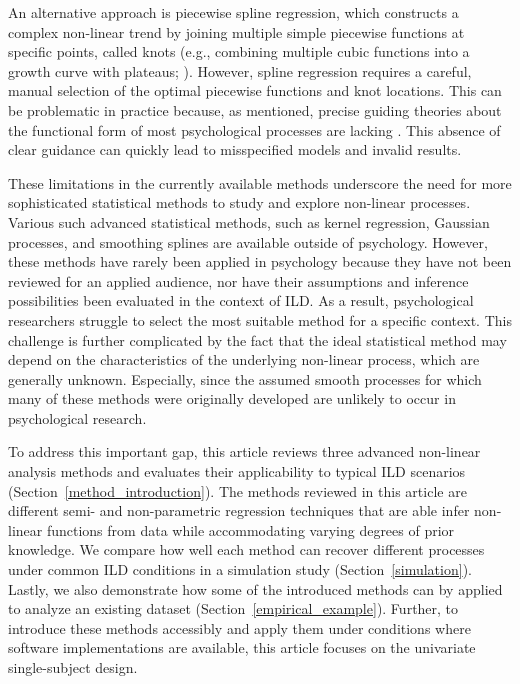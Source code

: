 \documentclass[man, floatsintext]{apa7}
\begin{document}
An alternative approach is piecewise spline regression, which constructs a
complex non-linear trend by joining multiple simple piecewise functions at
specific points, called knots (e.g., combining multiple cubic functions into a
growth curve with plateaus; \textcite{tsay_nonlinear_2019}). However, spline
regression requires a careful, manual selection of the optimal piecewise
functions and knot locations. This can be problematic in practice because, as
mentioned, precise guiding theories about the functional form of most
psychological processes are lacking \parencite{tan_time-varying_2011}. This
absence of clear guidance can quickly lead to misspecified models and invalid
results.

These limitations in the currently available methods underscore the need for
more sophisticated statistical methods to study and explore non-linear
processes. Various such advanced statistical methods, such as kernel
regression, Gaussian processes, and smoothing splines are available outside of
psychology. However, these methods have rarely been applied in psychology
because they have not been reviewed for an applied audience, nor have their
assumptions and inference possibilities been evaluated in the context of ILD.\@
As a result, psychological researchers struggle to select the most suitable
method for a specific context. This challenge is further complicated by the
fact that the ideal statistical method may depend on the characteristics of the
underlying non-linear process, which are generally unknown. Especially, since
the assumed smooth processes for which many of these methods were originally
developed are unlikely to occur in psychological research.

To address this important gap, this article reviews three advanced non-linear
analysis methods and evaluates their applicability to typical ILD scenarios
(Section~\ref{method_introduction}). The methods reviewed in this article are
different semi- and non-parametric regression techniques that are able infer
non-linear functions from data while accommodating varying degrees of prior
knowledge. We compare how well each method can recover different processes
under common ILD conditions in a simulation study (Section~\ref{simulation}).
Lastly, we also demonstrate how some of the introduced methods can by applied
to analyze an existing dataset (Section~\ref{empirical_example}). Further, to
introduce these methods accessibly and apply them under conditions where
software implementations are available, this article focuses on the univariate
single-subject design.
\end{document}
